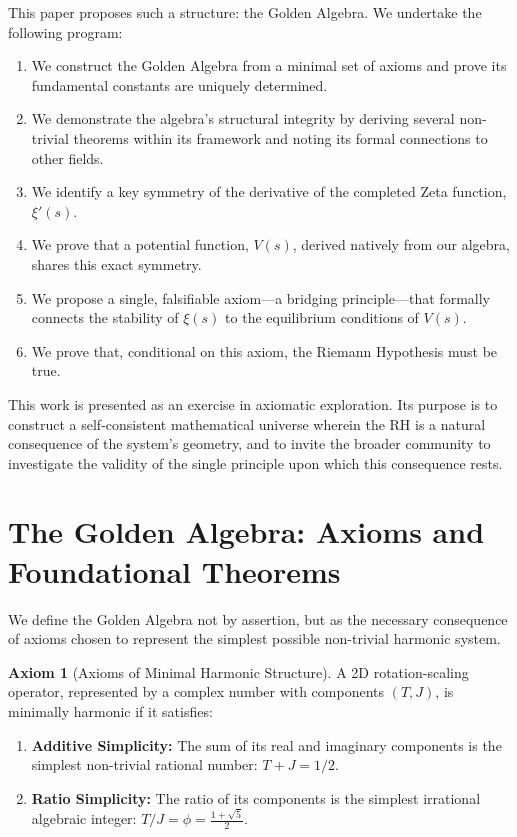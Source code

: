 \documentclass{article}
\theoremstyle{plain}
\theoremstyle{definition}
\newtheorem{axiom}{Axiom}
\theoremstyle{remark}
\begin{document}
This paper proposes such a structure: the Golden Algebra. We undertake the following program:
\begin{enumerate}
    \item We construct the Golden Algebra from a minimal set of axioms and prove its fundamental constants are uniquely determined.
    \item We demonstrate the algebra's structural integrity by deriving several non-trivial theorems within its framework and noting its formal connections to other fields.
    \item We identify a key symmetry of the derivative of the completed Zeta function, $\xi'(s)$.
    \item We prove that a potential function, $V(s)$, derived natively from our algebra, shares this exact symmetry.
    \item We propose a single, falsifiable axiom—a bridging principle—that formally connects the stability of $\xi(s)$ to the equilibrium conditions of $V(s)$.
    \item We prove that, conditional on this axiom, the Riemann Hypothesis must be true.
\end{enumerate}
This work is presented as an exercise in axiomatic exploration. Its purpose is to construct a self-consistent mathematical universe wherein the RH is a natural consequence of the system's geometry, and to invite the broader community to investigate the validity of the single principle upon which this consequence rests.

\section{The Golden Algebra: Axioms and Foundational Theorems}
We define the Golden Algebra not by assertion, but as the necessary consequence of axioms chosen to represent the simplest possible non-trivial harmonic system.

\begin{axiom}[Axioms of Minimal Harmonic Structure]
A 2D rotation-scaling operator, represented by a complex number with components $(T, J)$, is minimally harmonic if it satisfies:
\begin{enumerate}
    \item \textbf{Additive Simplicity:} The sum of its real and imaginary components is the simplest non-trivial rational number: $T+J = 1/2$.
    \item \textbf{Ratio Simplicity:} The ratio of its components is the simplest irrational algebraic integer: $T/J = \phi = \frac{1+\sqrt{5}}{2}$.
\end{enumerate}
\end{axiom}
\end{document}
